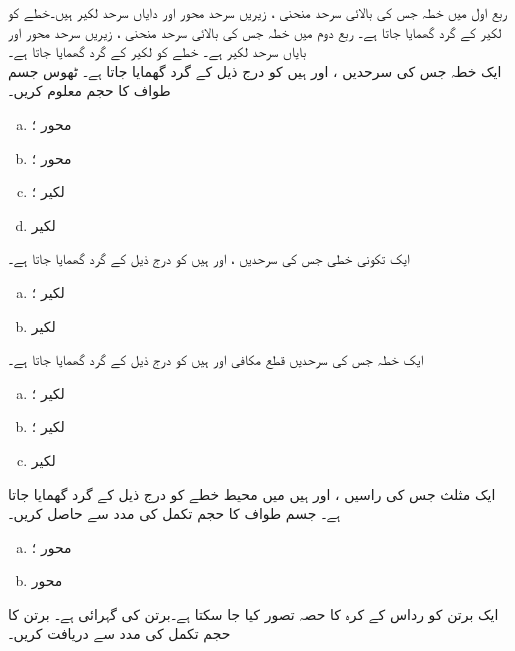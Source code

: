 ربع اول میں خطہ جس کی بالائی سرحد منحنی ، زیریں سرحد محور  اور دایاں سرحد لکیر  ہیں۔خطے کو لکیر  کے گرد گھمایا جاتا ہے۔
ربع دوم میں خطہ جس کی بالائی سرحد منحنی ، زیریں سرحد محور  اور بایاں سرحد لکیر  ہے۔ خطے کو لکیر  کے گرد گھمایا جاتا ہے۔
\\
ایک خطہ جس کی سرحدیں ،  اور  ہیں کو درج ذیل کے گرد گھمایا جاتا ہے۔ ٹھوس جسم طواف کا حجم معلوم کریں۔
\begin{enumerate}[a.]
\item
محور ؛
\item
محور ؛
\item
لکیر ؛
\item
لکیر 
\end{enumerate}
ایک تکونی خطی جس کی سرحدیں ،  اور  ہیں کو درج ذیل کے گرد گھمایا جاتا ہے۔
\begin{enumerate}[a.]
\item
لکیر ؛
\item
لکیر 
\end{enumerate}
ایک خطہ جس کی سرحدیں قطع مکافی  اور  ہیں کو درج ذیل کے گرد گھمایا جاتا ہے۔
\begin{enumerate}[a.]
\item
لکیر ؛
\item
لکیر ؛
\item
لکیر 
\end{enumerate}
ایک مثلث جس کی راسیں ،  اور  ہیں میں محیط خطے کو درج ذیل کے گرد گھمایا جاتا ہے۔ جسم طواف کا حجم تکمل کی مدد سے حاصل کریں۔
\begin{enumerate}[a.]
\item
محور ؛
\item
محور 
\end{enumerate}
ایک برتن کو رداس  کے کرہ کا حصہ تصور کیا جا سکتا ہے۔برتن کی گہرائی  ہے۔  برتن کا حجم تکمل کی مدد سے دریافت کریں۔
